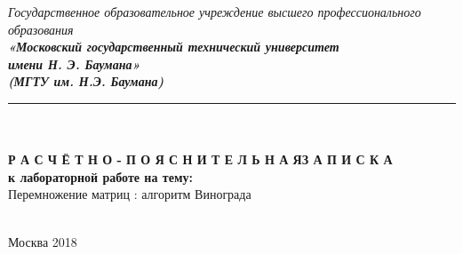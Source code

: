 


\begin{center}
	\hfill \break
	\textit{
		\normalsize{Государственное образовательное учреждение высшего профессионального образования}}\\ 
	
	\textit{
		\normalsize  {\bf  «Московский государственный технический университет}\\ 
		\normalsize  {\bf имени Н. Э. Баумана»}\\
		\normalsize  {\bf (МГТУ им. Н.Э. Баумана)}\\
	}
	\noindent\rule{\textwidth}{2pt}
	\hfill \break
	\noindent
	\\
	\noindent
	\\
	\hfill\break
	\hfill \break
	\hfill \break
	\hfill \break
	\normalsize{\bf Р А С Ч Ё Т Н О - П О Я С Н И Т Е Л Ь Н А Я\space\space З А П И С К А}\\
	\normalsize{\bf к лабораторной работе на тему:}\\
	\hfill \break
	\large{Перемножение матриц : алгоритм Винограда}\\
	\hfill \break
	\hfill \break
	\hfill \break
	\hfill \break
	\hfill \break	
	\normalsize {
		\noindent
		\makebox[\textwidth][c]{}%
	}\\
	\hfill \break	
	\normalsize {
		\noindent
		\makebox[\textwidth][c]{ ~~~~~~~~      }%
	}
	\hfill \break
	\hfill \break
	\hfill \break
	\hfill \break
\end{center}
\hfill \break
\hfill \break
\begin{center} Москва 2018\end{center}

\thispagestyle{empty} %


